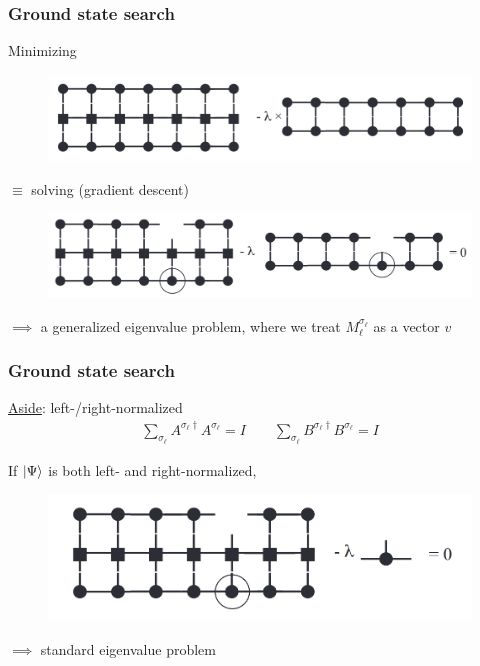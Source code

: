 \documentclass{beamer}
\theoremstyle{definition}
\begin{document}
\begin{frame}
	\frametitle{Ground state search}
	Minimizing
	\begin{figure}[!htb]
		\centering
		\includegraphics[scale=0.25]{gnd_state_search.png}
	\end{figure}
	$\equiv$ solving (gradient descent)
	\begin{figure}[!htb]
		\centering
		\includegraphics[scale=0.25]{gnd_state_search1.png}
	\end{figure}
	$\implies$ a generalized eigenvalue problem, where we treat $M^{\sigma_\ell}_\ell$ as a vector $v$
\end{frame}

\begin{frame}
	\frametitle{Ground state search}
	
	\underline{Aside}: left-/right-normalized
	\begin{align*}
		\sum_{\sigma_\ell} A^{\sigma_\ell\dagger} A^{\sigma_\ell} = I \quad\quad \sum_{\sigma_\ell} B^{\sigma_\ell\dagger} B^{\sigma_\ell} = I
	\end{align*}
	
	If $\ket{\Psi}$ is both left- and right-normalized,
	\begin{figure}[!htb]
		\centering
		\includegraphics[scale=0.25]{gnd_state_search2.png}
\end{figure}
	$\implies$ standard eigenvalue problem 
\end{frame}
\end{document}
